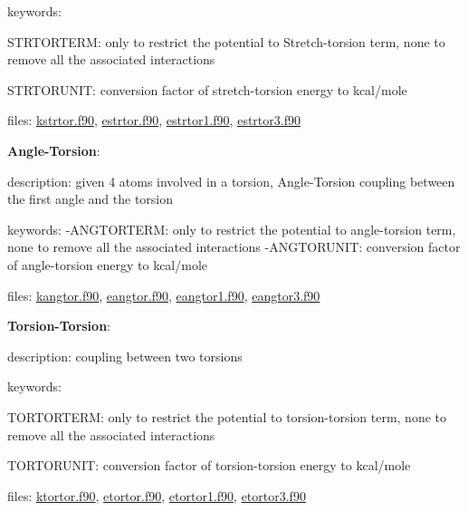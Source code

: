 \begin{DoxyItemize}
\begin{DoxyItemize}
\item keywords\-:
\begin{DoxyItemize}
\item S\-T\-R\-T\-O\-R\-T\-E\-R\-M\-: only to restrict the potential to Stretch-\/torsion term, none to remove all the associated interactions
\item S\-T\-R\-T\-O\-R\-U\-N\-I\-T\-: conversion factor of stretch-\/torsion energy to kcal/mole
\end{DoxyItemize}
\item files\-: \hyperlink{kstrtor_8f90}{kstrtor.\-f90}, \hyperlink{estrtor_8f90}{estrtor.\-f90}, \hyperlink{estrtor1_8f90}{estrtor1.\-f90}, \hyperlink{estrtor3_8f90}{estrtor3.\-f90}
\end{DoxyItemize}
\item {\bfseries Angle-\/\-Torsion}\-:
\begin{DoxyItemize}
\item description\-: given 4 atoms involved in a torsion, Angle-\/\-Torsion coupling between the first angle and the torsion
\item keywords\-: -\/\-A\-N\-G\-T\-O\-R\-T\-E\-R\-M\-: only to restrict the potential to angle-\/torsion term, none to remove all the associated interactions -\/\-A\-N\-G\-T\-O\-R\-U\-N\-I\-T\-: conversion factor of angle-\/torsion energy to kcal/mole
\item files\-: \hyperlink{kangtor_8f90}{kangtor.\-f90}, \hyperlink{eangtor_8f90}{eangtor.\-f90}, \hyperlink{eangtor1_8f90}{eangtor1.\-f90}, \hyperlink{eangtor3_8f90}{eangtor3.\-f90}
\end{DoxyItemize}
\item {\bfseries Torsion-\/\-Torsion}\-:
\begin{DoxyItemize}
\item description\-: coupling between two torsions
\item keywords\-:
\begin{DoxyItemize}
\item T\-O\-R\-T\-O\-R\-T\-E\-R\-M\-: only to restrict the potential to torsion-\/torsion term, none to remove all the associated interactions
\item T\-O\-R\-T\-O\-R\-U\-N\-I\-T\-: conversion factor of torsion-\/torsion energy to kcal/mole
\end{DoxyItemize}
\item files\-: \hyperlink{ktortor_8f90}{ktortor.\-f90}, \hyperlink{etortor_8f90}{etortor.\-f90}, \hyperlink{etortor1_8f90}{etortor1.\-f90}, \hyperlink{etortor3_8f90}{etortor3.\-f90}

\end{DoxyItemize}
\end{DoxyItemize}
